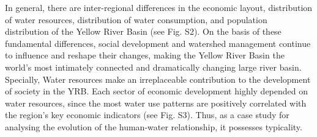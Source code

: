 \documentclass[9pt,twoside,lineno]{pnas-new}
\begin{document}
In general, there are inter-regional differences in the economic layout, distribution of water resources, distribution of water consumption, and population distribution of the Yellow River Basin (see Fig. S2). On the basis of these fundamental differences, social development and watershed management continue to influence and reshape their changes, making the Yellow River Basin the world's most intimately connected and dramatically changing large river basin. Specially, Water resources make an irreplaceable contribution to the development of society in the YRB. Each sector of economic development highly depended on water resources, since the most water use patterns are positively correlated with the region's key economic indicators (see Fig. S3). Thus, as a case study for analysing the evolution of the human-water relationship, it possesses typicality.


\end{document}
